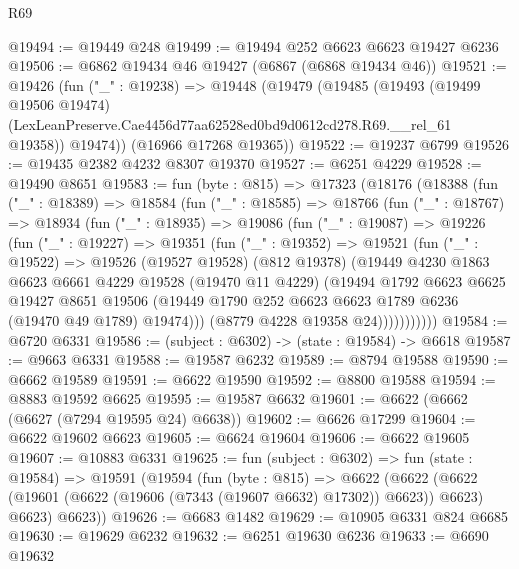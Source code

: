 \begin{lexlean}{R69}
\begin{coremodule}
{@19494 := @19449 @248
@19499 := @19494 @252 @6623 @6623 @19427 @6236
@19506 := @6862 @19434 @46 @19427 (@6867 (@6868 @19434 @46))
@19521 := @19426
    (fun ("_" : @19238) =>
    @19448
      (@19479
        (@19485
          (@19493
            (@19499 @19506 @19474)
            (LexLeanPreserve.Cae4456d77aa62528ed0bd9d0612cd278.R69.__rel_61 @19358))
          @19474))
      (@16966 @17268 @19365))
@19522 := @19237 @6799
@19526 := @19435 @2382 @4232 @8307 @19370
@19527 := @6251 @4229
@19528 := @19490 @8651
@19583 := fun (byte : @815) =>
  @17323
    (@18176
      (@18388
        (fun ("_" : @18389) =>
        @18584
          (fun ("_" : @18585) =>
          @18766
            (fun ("_" : @18767) =>
            @18934
              (fun ("_" : @18935) =>
              @19086
                (fun ("_" : @19087) =>
                @19226
                  (fun ("_" : @19227) =>
                  @19351
                    (fun ("_" : @19352) =>
                    @19521
                      (fun ("_" : @19522) =>
                      @19526
                        (@19527 @19528)
                        (@812 @19378)
                        (@19449
                          @4230
                          @1863
                          @6623
                          @6661
                          @4229
                          @19528
                          (@19470 @11 @4229)
                          (@19494
                            @1792
                            @6623
                            @6625
                            @19427
                            @8651
                            @19506
                            (@19449 @1790 @252 @6623 @6623 @1789 @6236 (@19470 @49 @1789) @19474)))
                        (@8779 @4228 @19358 @24)))))))))))
@19584 := @6720 @6331
@19586 := (subject : @6302) -> (state : @19584) -> @6618
@19587 := @9663 @6331
@19588 := @19587 @6232
@19589 := @8794 @19588
@19590 := @6662 @19589
@19591 := @6622 @19590
@19592 := @8800 @19588
@19594 := @8883 @19592 @6625
@19595 := @19587 @6632
@19601 := @6622 (@6662 (@6627 (@7294 @19595 @24) @6638))
@19602 := @6626 @17299
@19604 := @6622 @19602 @6623
@19605 := @6624 @19604
@19606 := @6622 @19605
@19607 := @10883 @6331
@19625 := fun (subject : @6302) =>
  fun (state : @19584) =>
  @19591
    (@19594
      (fun (byte : @815) =>
      @6622
        (@6622 (@6622 (@19601 (@6622 (@19606 (@7343 (@19607 @6632) @17302)) @6623)) @6623) @6623)
        @6623))
@19626 := @6683 @1482
@19629 := @10905 @6331 @824 @6685
@19630 := @19629 @6232
@19632 := @6251 @19630 @6236
@19633 := @6690 @19632
}
\end{coremodule}
\end{lexlean}

